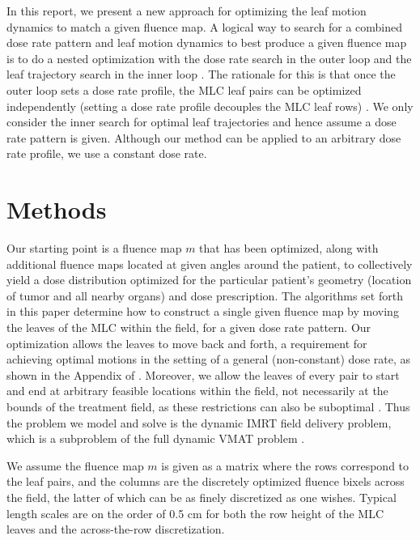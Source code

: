 \documentclass{iopart}
\begin{document}
In this report, we present a new approach for optimizing the leaf motion dynamics to match a given fluence map. A logical way to search for a combined dose rate pattern and leaf motion dynamics to best produce a given fluence map is to do a nested optimization with the dose rate search in the outer loop and the leaf trajectory search in the inner loop \cite{thesisKvA}. The rationale for this is that once the outer loop sets a dose rate profile, the MLC leaf pairs can be optimized independently (setting a dose rate profile decouples the MLC leaf rows) \cite{balvertcraft,thesisKvA}. We only consider the inner search for optimal leaf trajectories and hence assume a dose rate pattern is given. Although our method can be applied to an arbitrary dose rate profile, we use a constant dose rate.

\section{Methods}
\label{sec:model}

Our starting point is a fluence map $m$ that has been optimized, along with additional fluence maps located at given angles around the patient, to collectively yield a dose distribution optimized for the particular patient's geometry (location of tumor and all nearby organs) and dose prescription. The algorithms set forth in this paper determine how to construct a single given fluence map by moving the leaves of the MLC within the field, for a given dose rate pattern. Our optimization allows the leaves to move back and forth, a requirement for achieving optimal motions in the setting of a general (non-constant) dose rate, as shown in the Appendix of \cite{balvertcraft}. Moreover, we allow the leaves of every pair to start and end at arbitrary feasible locations within the field, not necessarily at the bounds of the treatment field, as these restrictions can also be suboptimal \cite{thesisKvA}. Thus the problem we model and solve is the dynamic IMRT field delivery problem, which is a subproblem of the full dynamic VMAT problem \cite{vmerge}.

We assume the fluence map $m$ is given as a matrix where the rows correspond to the leaf pairs, and the columns are the discretely optimized fluence bixels across the field, the latter of which can be as finely discretized as one wishes. Typical length scales are on the order of 0.5 cm for both the row height of the MLC leaves and the across-the-row discretization.
\end{document}
